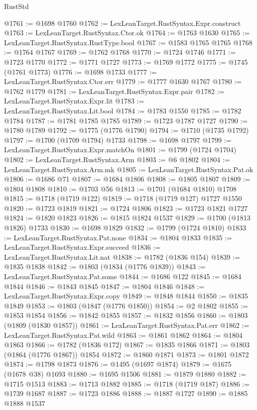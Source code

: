 \begin{lexlean}{RustStd}
\begin{coremodule}
@1761 := @1698 @1760
@1762 := LexLeanTarget.RustSyntax.Expr.construct
@1763 := LexLeanTarget.RustSyntax.Ctor.ok
@1764 := @1763 @1630
@1765 := LexLeanTarget.RustSyntax.RustType.bool
@1767 := @1583 @1765 @1765
@1768 := @1764 @1767
@1769 := @1762 @1768
@1770 := @1724 @1746
@1771 := @1723 @1770
@1772 := @1771 @1727
@1773 := @1769 @1772
@1775 := @1745 (@1761 @1773)
@1776 := @1698 @1733
@1777 := LexLeanTarget.RustSyntax.Ctor.err
@1779 := @1777 @1630 @1767
@1780 := @1762 @1779
@1781 := LexLeanTarget.RustSyntax.Expr.pair
@1782 := LexLeanTarget.RustSyntax.Expr.lit
@1783 := LexLeanTarget.RustSyntax.Lit.bool
@1784 := @1783 @1550
@1785 := @1782 @1784
@1787 := @1781 @1785 @1785
@1789 := @1723 @1787 @1727
@1790 := @1780 @1789
@1792 := @1775 (@1776 @1790)
@1794 := @1710 (@1735 @1792)
@1797 := @1700 (@1709 @1794) @1733
@1798 := @1698 @1797
@1799 := LexLeanTarget.RustSyntax.Expr.matchOn
@1801 := @1799 (@1724 @1704)
@1802 := LexLeanTarget.RustSyntax.Arm
@1803 := @6 @1802
@1804 := LexLeanTarget.RustSyntax.Arm.mk
@1805 := LexLeanTarget.RustSyntax.Pat.ok
@1806 := @1686 @71
@1807 := @1684 @1806
@1808 := @1805 @1807
@1809 := @1804 @1808
@1810 := @1703 @56
@1813 := @1701 (@1684 @1810) @1708
@1815 := @1718 (@1719 @122)
@1819 := @1718 (@1719 @127) @1727 @1550
@1820 := @1723 @1819
@1821 := @1724 @1806
@1823 := @1723 @1821 @1727
@1824 := @1820 @1823
@1826 := @1815 @1824 @1537
@1829 := @1700 (@1813 @1826) @1733
@1830 := @1698 @1829
@1832 := @1799 (@1724 @1810)
@1833 := LexLeanTarget.RustSyntax.Pat.none
@1834 := @1804 @1833
@1835 := LexLeanTarget.RustSyntax.Expr.succeed
@1836 := LexLeanTarget.RustSyntax.Lit.nat
@1838 := @1782 (@1836 @154)
@1839 := @1835 @1838
@1842 := @1803 (@1834 (@1776 @1839))
@1843 := LexLeanTarget.RustSyntax.Pat.some
@1844 := @1686 @122
@1845 := @1684 @1844
@1846 := @1843 @1845
@1847 := @1804 @1846
@1848 := LexLeanTarget.RustSyntax.Expr.copy
@1849 := @1848 @1844
@1850 := @1835 @1849
@1853 := @1803 (@1847 (@1776 @1850))
@1854 := @2 @1802
@1855 := @1853 @1854
@1856 := @1842 @1855
@1857 := @1832 @1856
@1860 := @1803 (@1809 (@1830 @1857))
@1861 := LexLeanTarget.RustSyntax.Pat.err
@1862 := LexLeanTarget.RustSyntax.Pat.wild
@1863 := @1861 @1862
@1864 := @1804 @1863
@1866 := @1782 (@1836 @172)
@1867 := @1835 @1866
@1871 := @1803 (@1864 (@1776 @1867)) @1854
@1872 := @1860 @1871
@1873 := @1801 @1872
@1874 := @1798 @1873
@1876 := @1495 (@1697 @1874)
@1879 := @1675 (@1678 @38) @1693
@1880 := @1695 @1506
@1881 := @1879 @1880
@1882 := @1715 @1513
@1883 := @1713 @1882
@1885 := @1718 (@1719 @187)
@1886 := @1739 @1687
@1887 := @1723 @1886
@1888 := @1887 @1727
@1890 := @1885 @1888 @1537

\end{coremodule}
\end{lexlean}
